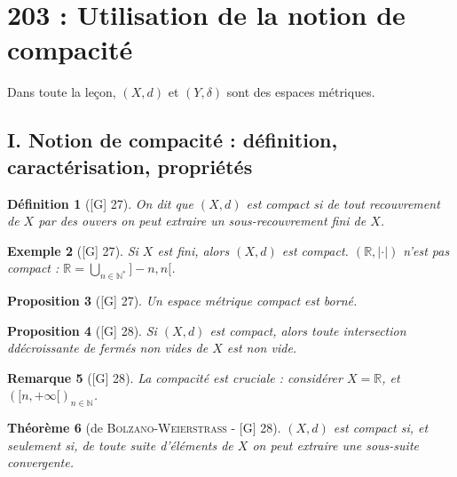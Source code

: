 \documentclass[10pt, a4paper, parskip=full, twoside, twocolumn]{report}
\newtheorem{definition}{Définition}
\newtheorem{theorem}[definition]{Théorème}
\newtheorem{proposition}[definition]{Proposition}
\newtheorem{example}[definition]{Exemple}
\newtheorem{remark}[definition]{Remarque}
\newcommand{\IN}{\mathbb{N}}
\newcommand{\IR}{\mathbb{R}}
\begin{document}

\chapter*{203 : Utilisation de la notion de compacité}
\setcounter{definition}{0}

\textcolor{paragraphtext}{Dans toute la leçon, $(X,d)$ et $(Y,\delta)$ sont des espaces métriques.}
\section*{I. Notion de compacité : définition, caractérisation, propriétés}

\begin{definition}[\textnormal{[G] 27}]
	On dit que $(X,d)$ est \emph{compact} si de tout recouvrement de $X$ par des ouvers on peut extraire un sous-recouvrement fini de $X$.
\end{definition}

\begin{example}[\textnormal{[G] 27}]
	Si $X$ est fini, alors $(X,d)$ est compact.
	$(\IR,\vert\cdot\vert)$ n'est pas compact : $\IR = \bigcup_{n\in\IN^*}]-n,n[$.
\end{example}

\begin{proposition}[\textnormal{[G] 27}]
	Un espace métrique compact est borné.
\end{proposition}

\begin{proposition}[\textnormal{[G] 28}]
	Si $(X,d)$ est compact, alors toute intersection ddécroissante de fermés non vides de $X$ est non vide.
\end{proposition}

\begin{remark}[\textnormal{[G] 28}]
	La compacité est cruciale : considérer $X = \IR$, et $\left([n,+\infty[\right)_{n\in\IN}$.
\end{remark}

\begin{theorem}[de \textsc{Bolzano-Weierstrass} - \textnormal{[G] 28}]
	$(X,d)$ est compact si, et seulement si, de toute suite d'éléments de $X$ on peut extraire une sous-suite convergente.
\end{theorem}
\end{document}
